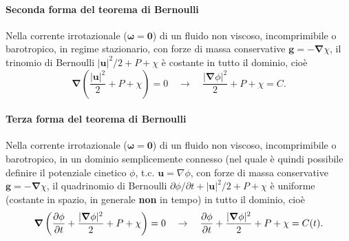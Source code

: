 \paragraph{Seconda forma del teorema di Bernoulli}
Nella corrente irrotazionale ($\bm{\omega} = \bm{0}$) di un fluido non viscoso, incomprimibile o barotropico, in regime stazionario, con forze di massa conservative $\bm{g} = -\bm{\nabla} \chi$, il trinomio di Bernoulli $|\bm{u}|^2/2 + P + \chi$ è costante in tutto il dominio, cioè
\begin{equation}
 \bm{\nabla} \left( \frac{|\bm{u}|^2}{2} + P + \chi \right) = 0  \quad \rightarrow \quad 
  \frac{|\bm{\nabla} \phi|^2}{2} + P + \chi = C.
\end{equation}
\paragraph{Terza forma del teorema di Bernoulli}
Nella corrente irrotazionale ($\bm{\omega} = \bm{0}$) di un fluido non viscoso, incomprimibile o barotropico, in un dominio semplicemente connesso (nel quale è quindi possibile definire il potenziale cinetico $\phi$, t.c. $\bm{u} = \nabla \phi$, con forze di massa conservative $\bm{g} = -\bm{\nabla} \chi$, il quadrinomio di Bernoulli $\partial \phi / \partial t + |\bm{u}|^2/2 + P + \chi$ è uniforme (costante in spazio, in generale \textbf{non} in tempo) in tutto il dominio, cioè
\begin{equation}
 \bm{\nabla} \left(\dfrac{\partial{\phi}}{\partial{t}} + \frac{|\bm{\nabla} \phi|^2}{2} + P + \chi \right) = 0  \quad \rightarrow \quad 
 \dfrac{\partial{\phi}}{\partial{t}} + \frac{|\bm{\nabla} \phi|^2}{2} + P + \chi = C(t).
\end{equation}

